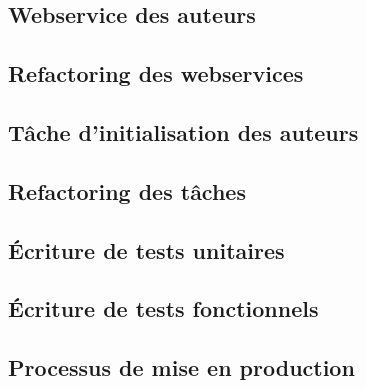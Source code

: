 \subsection{Webservice des auteurs}

\subsection{Refactoring des webservices}

\subsection{Tâche d'initialisation des auteurs}

\subsection{Refactoring des tâches}

\subsection{Écriture de tests unitaires}

\subsection{Écriture de tests fonctionnels}

\subsection{Processus de mise en production}
